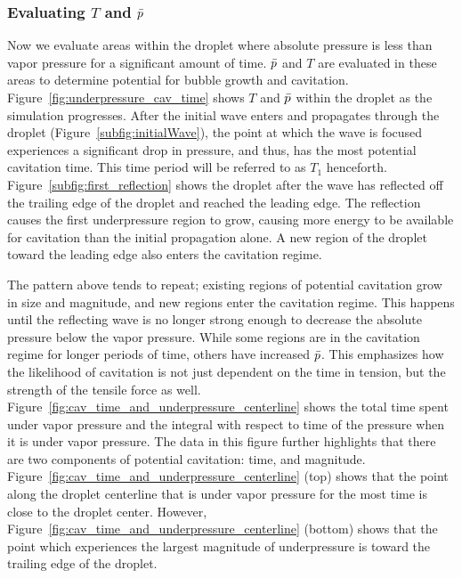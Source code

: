 \documentclass{UCF_ETD}
\begin{document}
\subsubsection{Evaluating $T$ and $\Bar{p}$}

Now we evaluate areas within the droplet where absolute pressure is less than vapor pressure for a significant amount of time.
$\Bar{p}$ and $T$ are evaluated in these areas to determine potential for bubble growth and cavitation.
Figure~\ref{fig:underpressure_cav_time} shows $T$ and $\Bar{p}$ within the droplet as the simulation progresses. 
After the initial wave enters and propagates through the droplet (Figure~\ref{subfig:initialWave}), the point at which the wave is focused experiences a significant drop in pressure, and thus, has the most potential cavitation time.
This time period will be referred to as $T_{1}$ henceforth. \\

Figure~\ref{subfig:first_reflection} shows the droplet after the wave has reflected off the trailing edge of the droplet and reached the leading edge. 
The reflection causes the first underpressure region to grow, causing more energy to be available for cavitation than the initial propagation alone.
A new region of the droplet toward the leading edge also enters the cavitation regime.

The pattern above tends to repeat; existing regions of potential cavitation grow in size and magnitude, and new regions enter the cavitation regime.
This happens until the reflecting wave is no longer strong enough to decrease the absolute pressure below the vapor pressure.
While some regions are in the cavitation regime for longer periods of time, others have increased $\Bar{p}$.
This emphasizes how the likelihood of cavitation is not just dependent on the time in tension, but the strength of the tensile force as well.\\

Figure~\ref{fig:cav_time_and_underpressure_centerline} shows the total time spent under vapor pressure and the integral with respect to time of the pressure when it is under vapor pressure.
The data in this figure further highlights that there are two components of potential cavitation: time, and magnitude.
Figure~\ref{fig:cav_time_and_underpressure_centerline} (top) shows that the point along the droplet centerline that is under vapor pressure for the most time is close to the droplet center.
However, Figure~\ref{fig:cav_time_and_underpressure_centerline} (bottom) shows that the point which experiences the largest magnitude of underpressure is toward the trailing edge of the droplet.
\end{document}

